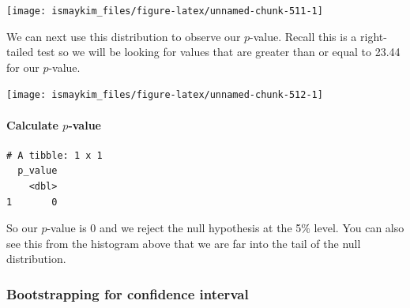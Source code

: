 \documentclass[12pt, krantz2,]{krantz}
\makeatletter
\newenvironment{Shaded}{\begin{snugshade}}{\end{snugshade}}
\newcommand{\DataTypeTok}[1]{\textcolor[rgb]{0.27,0.27,0.27}{#1}}
\newcommand{\KeywordTok}[1]{\textcolor[rgb]{0.27,0.27,0.27}{\textbf{#1}}}
\newcommand{\NormalTok}[1]{#1}
\newcommand{\OperatorTok}[1]{\textcolor[rgb]{0.43,0.43,0.43}{\textbf{#1}}}
\newcommand{\StringTok}[1]{\textcolor[rgb]{0.5,0.5,0.5}{#1}}
\let\oldparagraph\paragraph
\renewcommand{\paragraph}[1]{\oldparagraph{#1}\mbox{}}
\newenvironment{kframe}{%
\medskip{}
\setlength{\fboxsep}{.8em}
 \def\at@end@of@kframe{}%
 \ifinner\ifhmode%
  \def\at@end@of@kframe{\end{minipage}}%
  \begin{minipage}{\columnwidth}%
 \fi\fi%
 \def\FrameCommand##1{\hskip\@totalleftmargin \hskip-\fboxsep
 \colorbox{shadecolor}{##1}\hskip-\fboxsep
     \hskip-\linewidth \hskip-\@totalleftmargin \hskip\columnwidth}%
 \MakeFramed {\advance\hsize-\width
   \@totalleftmargin\z@ \linewidth\hsize
   \@setminipage}}%
 {\par\unskip\endMakeFramed%
 \at@end@of@kframe}
\renewenvironment{Shaded}{\begin{kframe}}{\end{kframe}}
\makeatother
\begin{document}
\begin{center}\texttt{[image: ismaykim\_files/figure-latex/unnamed-chunk-511-1]} \end{center}

We can next use this distribution to observe our \(p\)-value. Recall this is a right-tailed test so we will be looking for values that are greater than or equal to 23.44 for our \(p\)-value.

\begin{Shaded}
\end{Shaded}

\begin{center}\texttt{[image: ismaykim\_files/figure-latex/unnamed-chunk-512-1]} \end{center}

\hypertarget{calculate-p-value}{%
\paragraph{\texorpdfstring{Calculate \(p\)-value}{Calculate p-value}}\label{calculate-p-value}}

\begin{Shaded}
\end{Shaded}

\begin{verbatim}
# A tibble: 1 x 1
  p_value
    <dbl>
1       0
\end{verbatim}

So our \(p\)-value is 0 and we reject the null hypothesis at the 5\% level. You can also see this from the histogram above that we are far into the tail of the null distribution.

\hypertarget{bootstrapping-for-confidence-interval}{%
\subsubsection*{Bootstrapping for confidence interval}\label{bootstrapping-for-confidence-interval}}
\end{document}
